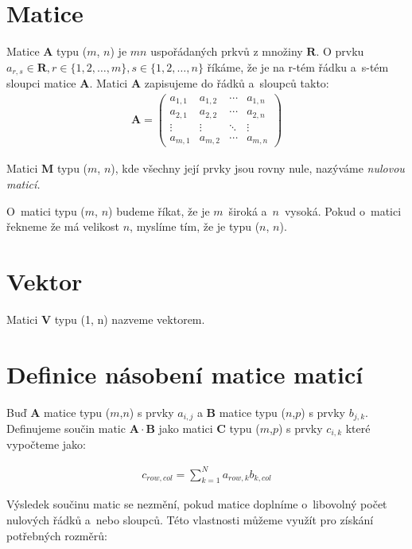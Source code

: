 

\section{Matice}

Matice \textbf{A} typu ($m$, $n$) je $m n$ uspořádaných prkvů z množiny $\mathbf{R}$. O prvku $a_{r,s} \in \mathbf{R}, r \in \{1,2,\hdots,m\},s \in \{1,2,\hdots,n\}$ říkáme, že je na r-tém řádku a~s-tém sloupci matice \textbf{A}. Matici \textbf{A} zapisujeme do řádků a~sloupců takto:
\begin{align}
\mathbf{A}=\begin{pmatrix}
a_{1,1} & a_{1,2} & \cdots & a_{1,n} \\
a_{2,1} & a_{2,2} & \cdots & a_{2,n} \\
\vdots  & \vdots  & \ddots & \vdots  \\
a_{m,1} & a_{m,2} & \cdots & a_{m,n}
\end{pmatrix}
\end{align}

Matici \textbf{M} typu ($m$, $n$), kde všechny její prvky jsou rovny nule, nazýváme \textit{nulovou maticí.}

O~matici typu ($m$, $n$) budeme říkat, že je $m$~široká a~$n$~vysoká. Pokud o~matici řekneme že má velikost $n$, myslíme tím, že je typu ($n$, $n$).

\section{Vektor}

Matici \textbf{V} typu (1, n) nazveme vektorem.

\section{Definice násobení matice maticí}

Buď \textbf{A} matice typu ($m$,$n$) s prvky $a_{i,j}$ a \textbf{B} matice typu ($n$,$p$) s prvky $b_{j,k}$. Definujeme součin matic $\mathbf{A} \cdot \mathbf{B}$ jako matici \textbf{C} typu ($m$,$p$) s prvky $c_{i,k}$ které vypočteme jako:

\begin{align}
c_{row,col}=\sum_{k=1}^{N} a_{row,k} b_{k,col}
\end{align}

Výsledek součinu matic se nezmění, pokud matice doplníme o~libovolný počet nulových řádků a~nebo sloupců. Této vlastnosti můžeme využít pro získání potřebných rozměrů:

